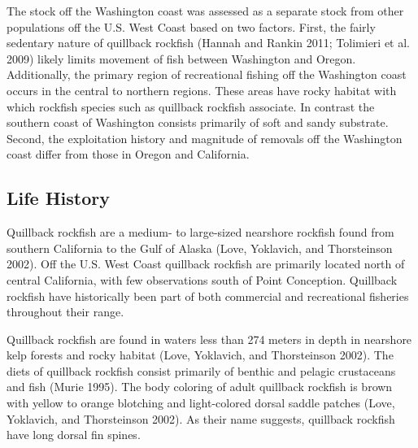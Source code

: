 \documentclass[11pt,
  english,
  a4paper,
]{article}
\begin{document}

The stock off the Washington coast was assessed as a separate stock from other populations off the U.S. West Coast based on two factors. First, the fairly sedentary nature of quillback rockfish {(Hannah and Rankin 2011; Tolimieri et al. 2009)\leavevmode\tagmcend\tagstructend} likely limits movement of fish between Washington and Oregon. Additionally, the primary region of recreational fishing off the Washington coast occurs in the central to northern regions. These areas have rocky habitat with which rockfish species such as quillback rockfish associate. In contrast the southern coast of Washington consists primarily of soft and sandy substrate. Second, the exploitation history and magnitude of removals off the Washington coast differ from those in Oregon and California.

\leavevmode\tagmcend\tagstructend\par


\hypertarget{life-history}{%
\subsection{Life History}\label{life-history}}

\leavevmode\tagmcend\tagstructend


Quillback rockfish are a medium- to large-sized nearshore rockfish found from southern California to the Gulf of Alaska {(Love, Yoklavich, and Thorsteinson 2002)\leavevmode\tagmcend\tagstructend}. Off the U.S. West Coast quillback rockfish are primarily located north of central California, with few observations south of Point Conception. Quillback rockfish have historically been part of both commercial and recreational fisheries throughout their range.

\leavevmode\tagmcend\tagstructend\par


Quillback rockfish are found in waters less than 274 meters in depth in nearshore kelp forests and rocky habitat {(Love, Yoklavich, and Thorsteinson 2002)\leavevmode\tagmcend\tagstructend}. The diets of quillback rockfish consist primarily of benthic and pelagic crustaceans and fish {(Murie 1995)\leavevmode\tagmcend\tagstructend}. The body coloring of adult quillback rockfish is brown with yellow to orange blotching and light-colored dorsal saddle patches {(Love, Yoklavich, and Thorsteinson 2002)\leavevmode\tagmcend\tagstructend}. As their name suggests, quillback rockfish have long dorsal fin spines.
\end{document}
